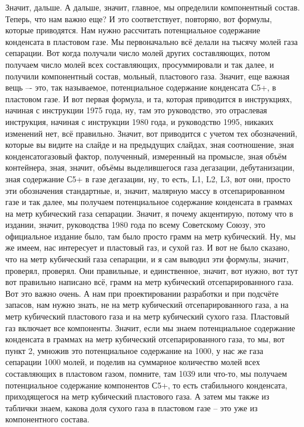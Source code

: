 \documentclass[main.tex]{subfiles}
\begin{document}
Значит, дальше.
А дальше, значит, главное, мы определили компонентный состав.
Теперь, что нам важно еще?
И это соответствует, повторяю, вот формулы, которые приводятся.
Нам нужно рассчитать потенциальное содержание конденсата в пластовом газе.
Мы первоначально всё делали на тысячу молей газа сепарации.
Вот когда получали число молей других составляющих, потом получаем число молей всех составляющих, просуммировали и так далее, и получили компонентный состав, мольный, пластового газа.
Значит, еще важная вещь –- это, так называемое, потенциальное содержание конденсата С5+, в пластовом газе.
И вот первая формула, и та, которая приводится в инструкциях, начиная с инструкции 1975 года, ну, там это руководство, это отраслевая инструкция, начиная с инструкции 1980 года, и руководство 1995, никаких изменений нет, всё правильно.
Значит, вот приводится с учетом тех обозначений, которые вы видите на слайде и на предыдущих слайдах, зная соотношение, зная конденсатогазовый фактор, полученный, измеренный на промысле, зная объём контейнера, зная, значит, объёмы выделившегося газа дегазации, дебутанизации, зная содержание С5+ в газе дегазации, ну, то есть, L1, L2, L3, вот они, просто эти обозначения стандартные, и, значит, малярную массу в отсепарированном газе и так далее, мы получаем потенциальное содержание конденсата в граммах на метр кубический газа сепарации.
Значит, я почему акцентирую, потому что в издании, значит, руководства 1980 года по всему Советскому Союзу, это официальное издание было, там было просто грамм на метр кубический.
Ну, мы же имеем, нас интересует и пластовый газ, и сухой газ.
И вот не было сказано, что на метр кубический газа сепарации, и я сам выводил эти формулы, значит, проверял, проверял.
Они правильные, и единственное, значит, вот нужно, вот тут вот правильно написано всё, грамм на метр кубический отсепарированного газа.
Вот это важно очень.
А нам при проектировании разработки и при подсчёте запасов, нам нужно знать, не на метр кубический отсепарированного газа, а на метр кубический пластового газа и на метр кубический сухого газа.
Пластовый газ включает все компоненты.
Значит, если мы знаем потенциальное содержание конденсата в граммах на метр кубический отсепарированного газа, то мы, вот пункт 2, умножив это потенциальное содержание на 1000, у нас же газа сепарации 1000 молей, и поделив на суммарное количество молей всех составляющих в пластовом газом, помните, там 1039 или что-то, мы получаем потенциальное содержание компонентов С5+, то есть стабильного конденсата, приходящегося на метр кубический пластового газа.
А затем мы также из таблички знаем, какова доля сухого газа в пластовом газе -- это уже из компонентного состава.
\end{document}
